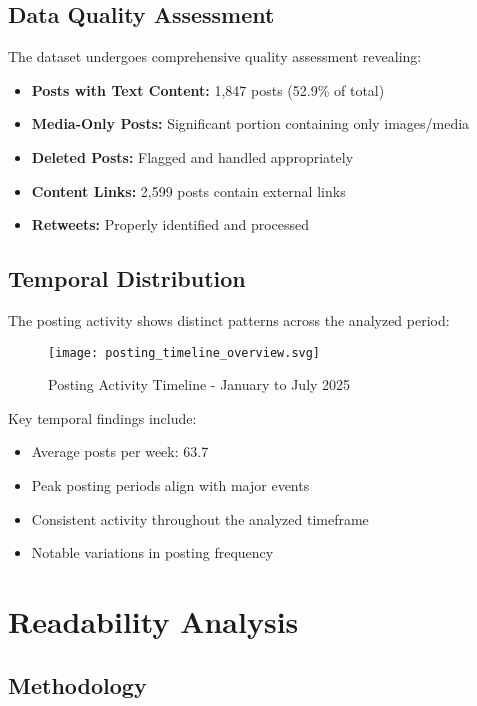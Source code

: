 \documentclass[12pt,a4paper]{article}
\begin{document}
\subsection{Data Quality Assessment}

The dataset undergoes comprehensive quality assessment revealing:

\begin{itemize}
\item \textbf{Posts with Text Content:} 1,847 posts (52.9\% of total)
\item \textbf{Media-Only Posts:} Significant portion containing only images/media
\item \textbf{Deleted Posts:} Flagged and handled appropriately
\item \textbf{Content Links:} 2,599 posts contain external links
\item \textbf{Retweets:} Properly identified and processed
\end{itemize}

\subsection{Temporal Distribution}

The posting activity shows distinct patterns across the analyzed period:

\begin{figure}[H]
\centering
\texttt{[image: posting\_timeline\_overview.svg]}
\caption{Posting Activity Timeline - January to July 2025}
\label{fig:posting_timeline}
\end{figure}

Key temporal findings include:
\begin{itemize}
\item Average posts per week: 63.7
\item Peak posting periods align with major events
\item Consistent activity throughout the analyzed timeframe
\item Notable variations in posting frequency
\end{itemize}

\section{Readability Analysis}

\subsection{Methodology}
\end{document}
